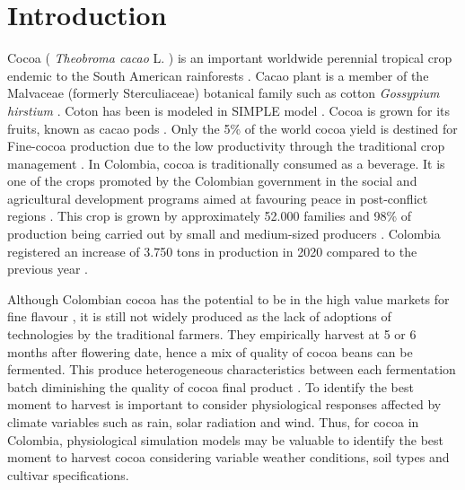 \documentclass[gene,journal,article,submit,moreauthors,pdftex]{Definitions/mdpi}
\begin{document}

\section{Introduction}
Cocoa ( \textit{Theobroma cacao }L. ) is an important worldwide perennial tropical crop endemic to the South American rainforests \citep{zuidema2005, motamayor2002, argout2011, Rodriguez2019}. Cacao plant is a member of the Malvaceae (formerly Sterculiaceae)  botanical family such as  cotton \textit{ Gossypium hirstium} \citep{Nix2017cotton}. Coton has been is modeled in SIMPLE model \citep{Zao2019simple}. Cocoa is grown for its fruits, known as cacao pods \citep{ Niemenak2010, suarez2021}. Only the 5\% of the world cocoa yield is destined for Fine-cocoa production due to the low productivity through  the traditional crop management \citep{argout2011}.  In Colombia, cocoa  is  traditionally  consumed  as  a  beverage. It is one of the crops promoted by the Colombian government in the social and agricultural development  programs aimed at favouring peace in post-conflict regions \citep{Rodriguez2019, Abbott2019}. This crop is grown by approximately 52.000 families \citep{Gutierrez2020} and 98\% of production being carried out by small and medium-sized producers \citep{Garcia2014, Escobar2020}. Colombia registered an increase of 3.750 tons in production in 2020 compared to the previous year \citep{lamos2020}. 

Although Colombian cocoa has the potential to be in the high value markets for fine flavour \citep{Escobar2020}, it is still not widely produced as the lack of adoptions of technologies by the traditional farmers. They empirically harvest at 5 or 6 months after flowering date, hence   a mix of quality of cocoa beans can be fermented. This produce heterogeneous characteristics between each fermentation batch diminishing the quality of cocoa final product \citep{Escobar2021}. To identify the best moment to harvest is important to consider physiological responses affected by climate variables such as rain, solar radiation and wind.  Thus,  for cocoa in Colombia, physiological simulation models may be valuable to identify the best moment to harvest cocoa considering variable weather conditions, soil types and cultivar specifications. 
\end{document}
